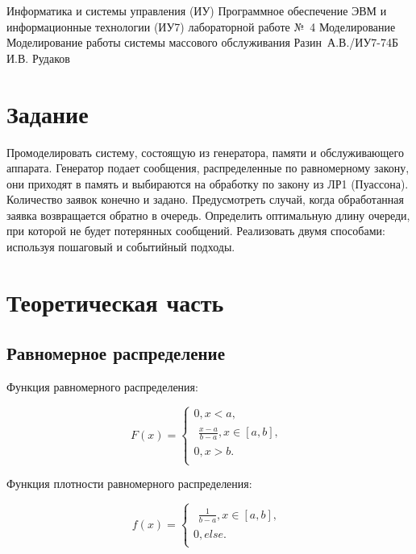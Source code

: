 \documentclass{bmstu}
\begin{document}
\makereporttitle
{Информатика и системы управления (ИУ)}
{Программное обеспечение ЭВМ и информационные технологии (ИУ7)}
{лабораторной работе №~4}
{Моделирование}
{Моделирование работы системы массового обслуживания}
{}
{Разин~А.В./ИУ7-74Б}
{И.В. Рудаков}


\setcounter{page}{2}
\renewcommand{\contentsname}{Содержание} 
\tableofcontents

\chapter{Задание}

Промоделировать систему, состоящую из генератора, памяти и обслуживающего аппарата. Генератор подает сообщения, распределенные по равномерному закону, они приходят в память и выбираются на обработку по закону из ЛР1 (Пуассона). Количество заявок конечно и задано. Предусмотреть случай, когда обработанная заявка возвращается обратно в очередь. Определить оптимальную длину очереди, при которой не будет потерянных сообщений. Реализовать двумя способами: используя пошаговый и событийный подходы.



\chapter{Теоретическая часть}

\section{Равномерное распределение}

Функция равномерного распределения:

\begin{equation}
    F(x) =
    \begin{cases}
            0, x < a, \\
            \begin{aligned}
                \frac{x -  a}{b - a}, x \in [a, b], 
            \end{aligned}\\
            0, x > b. \\
    \end{cases}
\end{equation}

Функция плотности равномерного распределения:

\begin{equation}
    f(x) =
    \begin{cases}
            \begin{aligned}
                \frac{1}{b - a}, x \in [a, b], 
            \end{aligned}\\
            0, else. \\
    \end{cases}
\end{equation}
\end{document}
